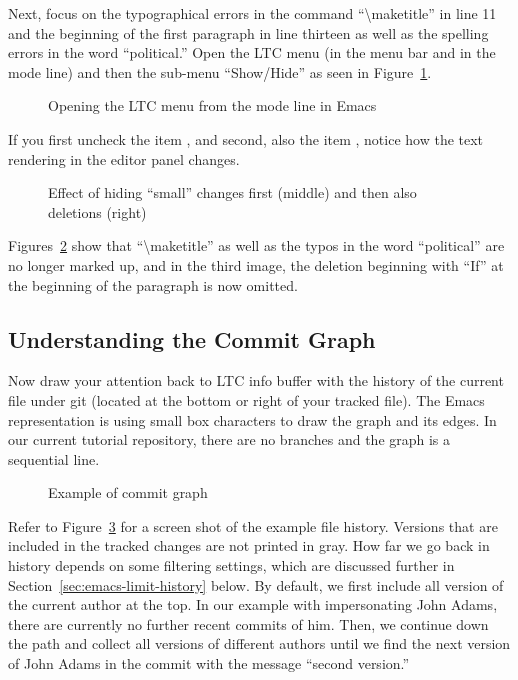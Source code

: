 Next, focus on the typographical errors in the command ``\textbackslash maketitle'' in line 11 and the beginning of the first paragraph in line thirteen as well as the spelling errors in the word ``political.''  Open the LTC menu (in the menu bar and in the mode line) and then the sub-menu ``Show/Hide'' as seen in Figure~\ref{fig:emacs-LTC-menu}.  
\begin{figure}[t]
\centering
{}
\caption{Opening the LTC menu from the mode line in Emacs} \label{fig:emacs-LTC-menu}
\end{figure}
If you first uncheck the item , and second, also the item , notice how the text rendering in the editor panel changes.
\begin{figure}[t]
  \centering
  \hspace{2em}
  \hspace{2em}
\caption{Effect of hiding ``small'' changes first (middle) and then also deletions (right)} \label{fig:emacs-filter-small}
\end{figure}
Figures~\ref{fig:emacs-filter-small} show that ``\textbackslash maketitle'' as well as the typos in the word ``political'' are no longer marked up, and in the third image, the deletion beginning with ``If'' at the beginning of the paragraph is now omitted.

\subsection{Understanding the Commit Graph}

Now draw your attention back to LTC info buffer with the history of the current file under git (located at the bottom or right of your tracked file).  The Emacs representation is using small box characters to draw the graph and its edges.  In our current tutorial repository, there are no branches and the graph is a sequential line.  
\begin{figure}[t]
\centering
{}
\caption{Example of commit graph} \label{fig:emacs-commit-graph}
\end{figure}
Refer to Figure~\ref{fig:emacs-commit-graph} for a screen shot of the example file history. Versions that are included in the tracked changes are not printed in gray.  How far we go back in history depends on some filtering settings, which are discussed further in Section~\ref{sec:emacs-limit-history} below.  By default, we first include all version of the current author at the top.  In our example with impersonating John Adams, there are currently no further recent commits of him.  Then, we continue down the path and collect all versions of different authors until we find the next version of John Adams in the commit with the message ``second version.''

